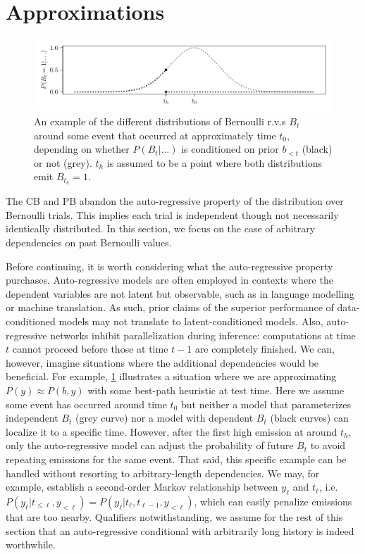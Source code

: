 \documentclass{article}
\begin{document}

\section{Approximations} \label{sec:approx}

\begin{figure}
\centering
\includegraphics[width=\textwidth]{pro_ar.pdf}
\caption{
%
An example of the different distributions of Bernoulli r.v.s $B_t$ around some
event that occurred at approximately time $t_0$, depending on whether
$P(B_t|\ldots)$ is conditioned on prior $b_{<t}$ (black) or not (grey). $t_h$
is assumed to be a point where both distributions emit $B_{t_h} = 1$.
%
} \label{fig:pro_ar}
\end{figure}

The CB and PB abandon the auto-regressive property of the distribution over
Bernoulli trials. This implies each trial is independent though not necessarily
identically distributed. In this section, we focus on the case of arbitrary
dependencies on past Bernoulli values.

Before continuing, it is worth considering what the auto-regressive property
purchases. Auto-regressive models are often employed in contexts where the
dependent variables are not latent but observable, such as in language
modelling or machine translation. As such, prior claims of the superior
performance of data-conditioned models may not translate to latent-conditioned
models. Also, auto-regressive networks inhibit parallelization during
inference: computations at time $t$ cannot proceed before those at time $t-1$
are completely finished. We can, however, imagine situations where the
additional dependencies would be beneficial. For example, \cref{fig:pro_ar}
illustrates a situation where we are approximating $P(y) \approx P(b, y)$ with
some best-path heuristic at test time. Here we assume some event has occurred
around time $t_0$ but neither a model that parameterizes independent $B_t$
(grey curve) nor a model with dependent $B_t$ (black curves) can localize it to
a specific time. However, after the first high emission at around $t_h$, only
the auto-regressive model can adjust the probability of future $B_t$ to avoid
repeating emissions for the same event. That said, this specific example can be
handled without resorting to arbitrary-length dependencies. We may, for
example, establish a second-order Markov relationship between $y_\ell$ and
$t_\ell$, i.e. $P(y_\ell|t_{\leq \ell}, y_{<\ell}) = P(y_\ell|t_\ell,
t_{\ell-1}, y_{<\ell})$, which can easily penalize emissions that are too
nearby. Qualifiers notwithstanding, we assume for the rest of this section that
an auto-regressive conditional with arbitrarily long history is indeed
worthwhile.
\end{document}
